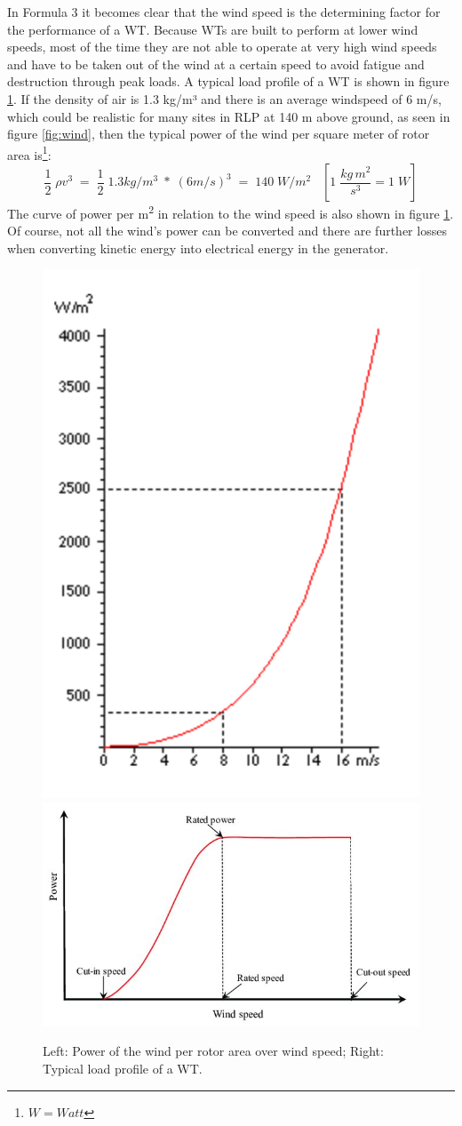 \documentclass[a4paper,11pt]{article}
\begin{document}
In Formula 3 it becomes clear that the wind speed is the determining factor for the performance of a WT. Because WTs are built to perform at lower wind speeds, most of the time they are not able to operate at very high wind speeds and have to be taken out of the wind at a certain speed to avoid fatigue and destruction through peak loads. A typical load profile of a WT is shown in figure \ref{fig:powerofwind}. If the density of air is 1.3 kg/m³ and there is an average windspeed of 6 m/s, which could be realistic for many sites in RLP at 140 m above ground, as seen in figure \ref{fig:wind}, then the typical power of the wind per square meter of rotor area is\footnote{\(W= Watt\)}:
\begin{equation}
\frac{1}{2}\; \rho v^3\;=\;\frac{1}{2}\;1.3 kg/m^3\; *\; (6 m/s)^3\;=\;140\; W/m^2\;\;\; [1\; \frac{kg\, m^2}{s^3} = 1\; W]
\end{equation}
The curve of power per m\textsuperscript{2} in relation to the wind speed is also shown in figure \ref{fig:powerofwind}. Of course, not all the wind's power can be converted and there are further losses when converting kinetic energy into electrical energy in the generator.
\begin{figure}

{\centering \includegraphics[width=0.49\linewidth,height=0.25\textheight]{figures/power2} \includegraphics[width=0.49\linewidth,height=0.25\textheight]{figures/Typical-wind-power-output-versus-wind-speed_W640} 

}

\caption{Left: Power of the wind per rotor area over wind speed; Right: Typical load profile of a WT.}\label{fig:powerofwind}
\end{figure}
\end{document}

